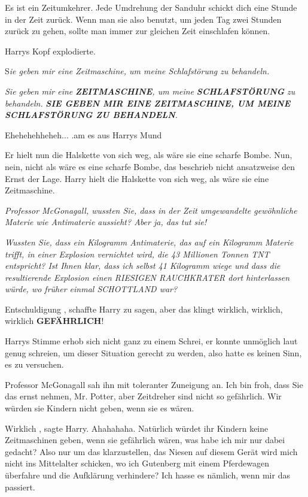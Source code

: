 \glqq Es ist ein Zeitumkehrer. Jede Umdrehung der Sanduhr schickt dich eine
Stunde in der Zeit zurück. Wenn man sie also benutzt, um jeden Tag zwei Stunden
zurück zu gehen, sollte man immer zur gleichen Zeit einschlafen können.\grqq{}

Harrys Kopf explodierte.

S\emph{ie geben mir eine Zeitmaschine, um meine Schlafstörung zu behandeln. }

\emph{Sie geben mir eine }\textbf{\emph{ZEITMASCHINE}}\emph{, um meine
}\textbf{\emph{SCHLAFSTÖRUNG}}\emph{ zu behandeln.} \emph{ }\textbf{\emph{SIE
GEBEN MIR EINE ZEITMASCHINE, UM MEINE SCHLAFSTÖRUNG ZU BEHANDELN}}\emph{.}

\glqq Ehehehehheheh...\grqq{} .am es aus Harrys Mund

Er hielt nun die Halskette von sich weg, als wäre sie eine scharfe Bombe. Nun,
nein, nicht als wäre es eine scharfe Bombe, das beschrieb nicht ansatzweise den
Ernst der Lage. Harry hielt die Halskette von sich weg, als wäre sie eine
Zeitmaschine.

\emph{Professor McGonagall, wussten Sie, dass in der Zeit umgewandelte
gewöhnliche Materie wie Antimaterie aussieht? Aber ja, das tut sie!}

\emph{ Wussten Sie, dass ein Kilogramm Antimaterie, das auf ein Kilogramm
Materie trifft, in einer Explosion vernichtet wird, die 43 Millionen Tonnen TNT
entspricht? Ist Ihnen klar, dass ich selbst 41 Kilogramm wiege und dass die
resultierende Explosion einen RIESIGEN RAUCHKRATER dort hinterlassen würde, wo
früher einmal SCHOTTLAND war?}

\glqq Entschuldigung\grqq{} , schaffte Harry zu sagen, \glqq aber das klingt
wirklich, wirklich, wirklich \textbf{GEFÄHRLICH}!\grqq{}

Harrys Stimme erhob sich nicht ganz zu einem Schrei, er konnte unmöglich laut
genug schreien, um dieser Situation gerecht zu werden, also hatte es keinen
Sinn, es zu versuchen.

Professor McGonagall sah ihn mit toleranter Zuneigung an. \glqq Ich bin froh,
dass Sie das ernst nehmen, Mr. Potter, aber Zeitdreher sind nicht so gefährlich.
Wir würden sie Kindern nicht geben, wenn sie es wären.\grqq{}

\glqq Wirklich\grqq{} , sagte Harry. \glqq Ahahahaha. Natürlich würdet ihr
Kindern keine Zeitmaschinen geben, wenn sie gefährlich wären, was habe ich mir
nur dabei gedacht? Also nur um das klarzustellen, das Niesen auf diesem Gerät
wird mich nicht ins Mittelalter schicken, wo ich Gutenberg mit einem Pferdewagen
überfahre und die Aufklärung verhindere? Ich hasse es nämlich, wenn mir das
passiert.\grqq{}


